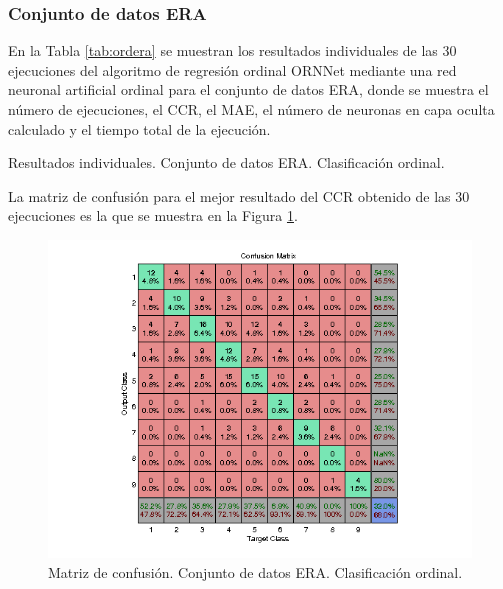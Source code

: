 			\subsubsection{Conjunto de datos ERA}
			
			En la Tabla \ref{tab:ordera} se muestran los resultados individuales de las 30 ejecuciones del algoritmo de regresión ordinal ORNNet mediante una red neuronal artificial ordinal para el conjunto de datos ERA, donde se muestra el número de ejecuciones, el CCR, el MAE, el número de neuronas en capa oculta calculado y el tiempo total de la ejecución.\\
			
			\begin{table}[!htbp]
				\centering
				\caption{Resultados individuales. Conjunto de datos ERA. Clasificación ordinal.}
				\label{tab:ordera}
			\end{table}
			
			La matriz de confusión para el mejor resultado del CCR obtenido de las 30 ejecuciones es la que se muestra en la Figura \ref{fig:ordera}.
			
			\begin{figure}[htbp]
				\centering
				\includegraphics[scale=0.8]{../src/results/ordinal/ERA_mc1.png}
				\caption{Matriz de confusión. Conjunto de datos ERA. Clasificación ordinal.}
				\label{fig:ordera}
			\end{figure}
			
